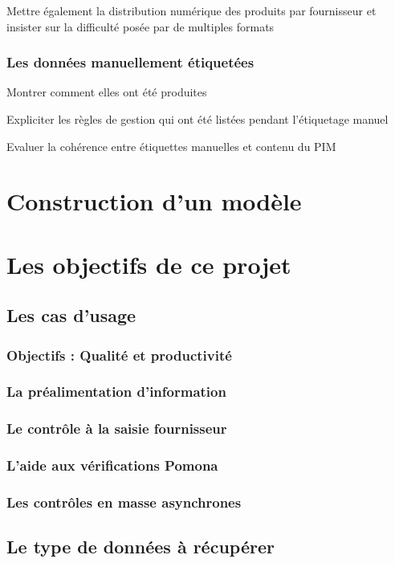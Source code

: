 \documentclass{report}
\begin{document}
        Mettre également la distribution numérique des produits par fournisseur et insister sur la difficulté posée par de multiples formats

        \section{Les données \og manuellement étiquetées \fg}

        Montrer comment elles ont été produites

        Expliciter les règles de gestion qui ont été listées pendant l'étiquetage manuel

        Evaluer la cohérence entre étiquettes manuelles et contenu du PIM

\part{Construction d'un modèle}

\part{Les objectifs de ce projet}
    \chapter{Les cas d'usage}
        \section{Objectifs : Qualité et productivité}
        \section{La préalimentation d'information}
        \section{Le contrôle à la saisie fournisseur}
        \section{L'aide aux vérifications Pomona}
        \section{Les contrôles en masse asynchrones}
    \chapter{Le type de données à récupérer}
\end{document}

